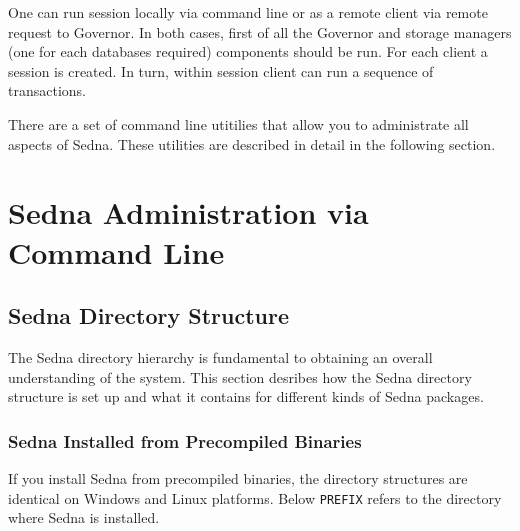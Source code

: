 \documentclass[a4paper,12pt]{article}
\begin{document}

One can run session locally via command line or as a remote client via remote request to Governor. In both cases, first of all the Governor and storage managers (one for each databases required) components should be run. For each client a session is created. In turn, within session client can run a sequence of transactions.



There are a set of command line utitilies that allow you to administrate all aspects of Sedna.
These utilities are described in detail in the following section.

\section{Sedna Administration via Command Line}

\subsection{Sedna Directory Structure}
\label{sec:dir-structure}
The Sedna directory hierarchy is fundamental to obtaining an overall understanding of the system. This section desribes 
how the Sedna directory structure is set up and what it contains for different kinds of Sedna packages.

\subsubsection{Sedna Installed from Precompiled Binaries}
\label{sec:binary-pack}
If you install Sedna from precompiled binaries, the directory structures are identical on Windows and Linux platforms.
Below \verb!PREFIX! refers to the directory where Sedna is installed.
\end{document}
